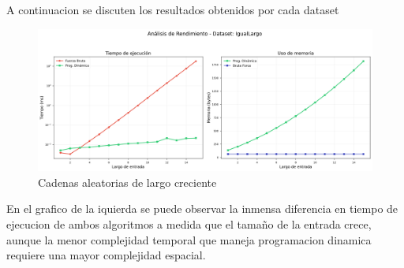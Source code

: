 
A continuacion se discuten los resultados obtenidos por cada dataset
\begin{figure}[H]
    \centering
        \includegraphics[width=\textwidth]{images/IgualLargo_analisis.png}
    \caption{Cadenas aleatorias de largo creciente}
    \label{fig:scatterplot_1}
\end{figure}
En el grafico de la iquierda se puede observar la inmensa diferencia en tiempo de ejecucion de ambos algoritmos a medida que el tamaño de la entrada crece,
aunque la menor complejidad temporal que maneja programacion dinamica requiere una mayor complejidad espacial.

